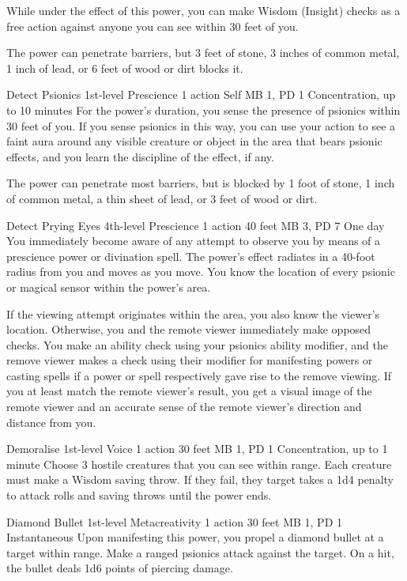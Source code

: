   While under the effect of this power,
  you can make Wisdom (Insight) checks as a free action
  against anyone you can see within 30 feet of you.
  
  The power can penetrate barriers, but 3 feet of stone,
  3 inches of common metal,
  1 inch of lead,
  or 6 feet of wood or dirt blocks it.

\DndPowerHeader%
  {Detect Psionics}
  {1st-level Prescience}
  {1 action}
  {Self}
  {MB 1, PD 1}
  {Concentration, up to 10 minutes}
For the power's duration,
you sense the presence of psionics within 30 feet of you.
If you sense psionics in this way,
you can use your action to see a faint aura around
any visible creature or object in the area that bears psionic effects,
and you learn the discipline of the effect, if any.

The power can penetrate most barriers, but is blocked by
1 foot of stone,
1 inch of common metal,
a thin sheet of lead,
or 3 feet of wood or dirt.

\DndPowerHeader%
  {Detect Prying Eyes}
  {4th-level Prescience}
  {1 action}
  {40 feet}
  {MB 3, PD 7}
  {One day}
  You immediately become aware of any attempt to observe you
  by means of a prescience power or divination spell.
  The power's effect radiates in a 40-foot radius
  from you and moves as you move.
  You know the location of every psionic or magical sensor
  within the power's area.

  If the viewing attempt originates within the area,
  you also know the viewer's location.
  Otherwise, you and the remote viewer immediately make opposed checks.
  You make an ability check using your psionics ability modifier,
  and the remove viewer makes a check using their modifier
  for manifesting powers or casting spells if a power or spell
  respectively gave rise to the remove viewing.
  If you at least match the remote viewer's result,
  you get a visual image of the remote viewer
  and an accurate sense of the remote viewer's
  direction and distance from you.

\DndPowerHeader%
  {Demoralise}
  {1st-level Voice}
  {1 action}
  {30 feet}
  {MB 1, PD 1}
  {Concentration, up to 1 minute}
Choose 3 hostile creatures that you can see within range.
Each creature must make a Wisdom saving throw.
If they fail, they target takes a 1d4 penalty to attack rolls and
saving throws until the power ends.

\DndPowerHeader%
  {Diamond Bullet}
  {1st-level Metacreativity}
  {1 action}
  {30 feet}
  {MB 1, PD 1}
  {Instantaneous}
  Upon manifesting this power,
  you propel a diamond bullet at a target within range.
  Make a ranged psionics attack against the target.
  On a hit, the bullet deals 1d6 points of piercing damage.

